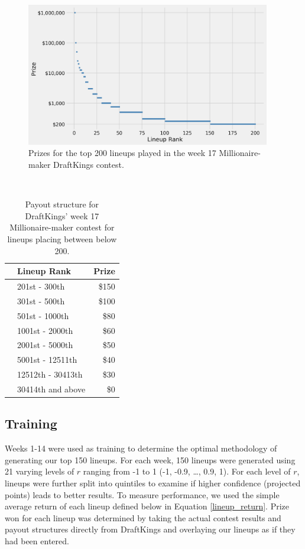 \documentclass[12pt]{article}
\begin{document}
\begin{figure}[H]
  \centering
  \includegraphics[width=0.95\textwidth]{../figures/payout_structure}
  \caption{Prizes for the top 200 lineups played in the week 17 Millionaire-maker DraftKings contest.}
  \label{payout structure}
\end{figure}

﻿\begin{table}[H]
\caption{Payout structure for DraftKings' week 17 Millionaire-maker contest for lineups placing between below 200.}
\centering
\begin{tabular}{llr}
\toprule
{} &              Lineup Rank &        Prize \\
\midrule
{} &      201st - 300th &        \$150 \\
{} &      301st - 500th &        \$100 \\
{} &     501st - 1000th &         \$80 \\
{} &    1001st - 2000th &         \$60 \\
{} &    2001st - 5000th &         \$50 \\
{} &   5001st - 12511th &         \$40 \\
{} &  12512th - 30413th &         \$30 \\
{} &  30414th and above &         \$0 \\
\bottomrule
\end{tabular}
\label{rest of payout structure}
\end{table}

\subsection{Training}
Weeks 1-14 were used as training to determine the optimal methodology of generating our top 150 lineups. For each week, 150 lineups were generated using 21 varying levels of $r$ ranging from -1 to 1 (-1, -0.9, \dots, 0.9, 1). For each level of $r$, lineups were further split into quintiles to examine if higher confidence (projected points) leads to better results. To measure performance, we used the simple average return of each lineup defined below in Equation \ref{lineup_return}. Prize won for each lineup was determined by taking the actual contest results and payout structures directly from DraftKings and overlaying our lineups as if they had been entered.  
\end{document}
